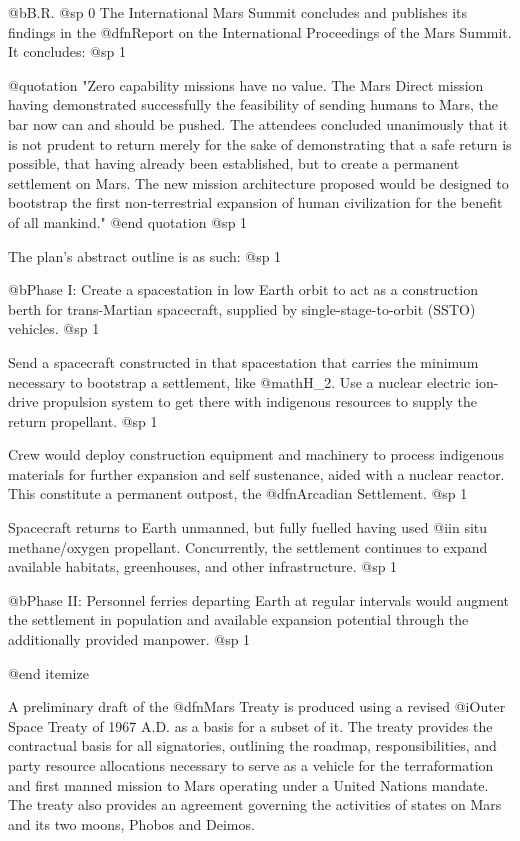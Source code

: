 @b{B.R.}
@sp 0
The International Mars Summit concludes and publishes its findings in the @dfn{Report on the International Proceedings of the Mars Summit}. It concludes:
@sp 1

@quotation
"Zero capability missions have no value. The Mars Direct mission having demonstrated successfully the feasibility of sending humans to Mars, the bar now can and should be pushed. The attendees concluded unanimously that it is not prudent to return merely for the sake of demonstrating that a safe return is possible, that having already been established, but to create a permanent settlement on Mars. The new mission architecture proposed would be designed to bootstrap the first non-terrestrial expansion of human civilization for the benefit of all mankind."
@end quotation
@sp 1

The plan's abstract outline is as such:
@sp 1
\itemize
\item
@b{Phase I:} Create a spacestation in low Earth orbit to act as a construction berth for trans-Martian spacecraft, supplied by single-stage-to-orbit (SSTO) vehicles.
@sp 1

\item
Send a spacecraft constructed in that spacestation that carries the minimum necessary to bootstrap a settlement, like @math{H_2}. Use a nuclear electric ion-drive propulsion system to get there with indigenous resources to supply the return propellant.
@sp 1

\item
Crew would deploy construction equipment and machinery to process indigenous materials for further expansion and self sustenance, aided with a nuclear reactor. This constitute a permanent outpost, the @dfn{Arcadian Settlement}.
@sp 1

\item
Spacecraft returns to Earth unmanned, but fully fuelled having used @i{in situ} methane/oxygen propellant. Concurrently, the settlement continues to expand available habitats, greenhouses, and other infrastructure.
@sp 1

\item
@b{Phase II:} Personnel ferries departing Earth at regular intervals would augment the settlement in population and available expansion potential through the additionally provided manpower.
@sp 1

@end itemize

A preliminary draft of the @dfn{Mars Treaty} is produced using a revised @i{Outer Space Treaty} of 1967 A.D. as a basis for a subset of it. The treaty provides the contractual basis for all signatories, outlining the roadmap, responsibilities, and party resource allocations necessary to serve as a vehicle for the terraformation and first manned mission to Mars operating under a United Nations mandate. The treaty also provides an agreement governing the activities of states on Mars and its two moons, Phobos and Deimos.

